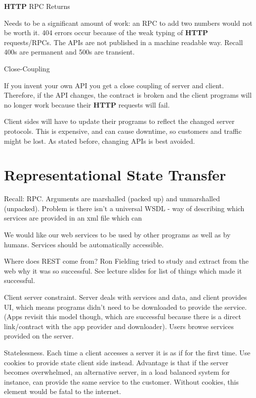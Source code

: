 \documentclass[11pt]{article}
\begin{document}
\textbf{HTTP} RPC Returns

Needs to be a significant amount of work: an RPC to add two numbers would not be worth it.
404 errors occur because of the weak typing of \textbf{HTTP} requests/RPCs. The APIs are not published in a machine readable way. Recall 400s are permanent and 500s are transient.

Close-Coupling

If you invent your own API you get a close coupling of server and client. Therefore, if the API changes, the contract is broken and the client programs will no longer work because their \textbf{HTTP} requests will fail.

Client sides will have to update their programs to reflect the changed server protocols. This is expensive, and can cause downtime, so customers and traffic might be lost. As stated before, changing APIs is best avoided.




\section{Representational State Transfer}
\label{sec:REST}

Recall: RPC. Arguments are marshalled (packed up) and unmarshalled (unpacked). Problem is there isn’t a universal WSDL - way of describing which services are provided in an xml file which can 

We would like our web services to be used by other programs as well as by humans. Services should be automatically accessible.

Where does REST come from? Ron Fielding tried to study and extract from the web why it was so successful. See lecture slides for list of things which made it successful.

Client server constraint. Server deals with services and data, and client provides UI, which means programs didn't need to be downloaded to provide the service. (Apps revisit this model though, which are successful because there is a direct link/contract with the app provider and downloader). Users browse services provided on the server.

Statelessness. Each time a client accesses a server it is as if for the first time. Use cookies to provide state client side instead. Advantage is that if the server becomes overwhelmed, an alternative server, in a load balanced system for instance, can provide the same service to the customer. Without cookies, this element would be fatal to the internet.
\end{document}
